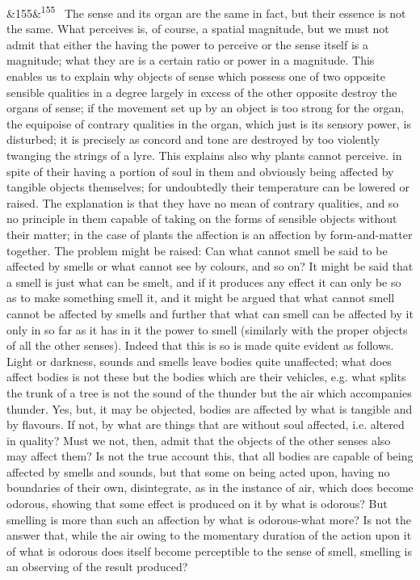 \documentclass[12pt]{article}
\newcommand{\para}[1][]{\par\noindent\ifx&#1&\else\textsuperscript{\footnotesize #1}~\fi}
\begin{document}
\para[155] The sense and its organ are the same in fact, but their essence is not the same. What perceives is, of course, a spatial magnitude, but we must not admit that either the having the power to perceive or the sense itself is a magnitude; what they are is a certain ratio or power in a magnitude. This enables us to explain why objects of sense which possess one of two opposite sensible qualities in a degree largely in excess of the other opposite destroy the organs of sense; if the movement set up by an object is too strong for the organ, the equipoise of contrary qualities in the organ, which just is its sensory power, is disturbed; it is precisely as concord and tone are destroyed by too violently twanging the strings of a lyre. This explains also why plants cannot perceive. in spite of their having a portion of soul in them and obviously being affected by tangible objects themselves; for undoubtedly their temperature can be lowered or raised. The explanation is that they have no mean of contrary qualities, and so no principle in them capable of taking on the forms of sensible objects without their matter; in the case of plants the affection is an affection by form-and-matter together. The problem might be raised: Can what cannot smell be said to be affected by smells or what cannot see by colours, and so on? It might be said that a smell is just what can be smelt, and if it produces any effect it can only be so as to make something smell it, and it might be argued that what cannot smell cannot be affected by smells and further that what can smell can be affected by it only in so far as it has in it the power to smell (similarly with the proper objects of all the other senses). Indeed that this is so is made quite evident as follows. Light or darkness, sounds and smells leave bodies quite unaffected; what does affect bodies is not these but the bodies which are their vehicles, e.g. what splits the trunk of a tree is not the sound of the thunder but the air which accompanies thunder. Yes, but, it may be objected, bodies are affected by what is tangible and by flavours. If not, by what are things that are without soul affected, i.e. altered in quality? Must we not, then, admit that the objects of the other senses also may affect them? Is not the true account this, that all bodies are capable of being affected by smells and sounds, but that some on being acted upon, having no boundaries of their own, disintegrate, as in the instance of air, which does become odorous, showing that some effect is produced on it by what is odorous? But smelling is more than such an affection by what is odorous-what more? Is not the answer that, while the air owing to the momentary duration of the action upon it of what is odorous does itself become perceptible to the sense of smell, smelling is an observing of the result produced?
\end{document}
